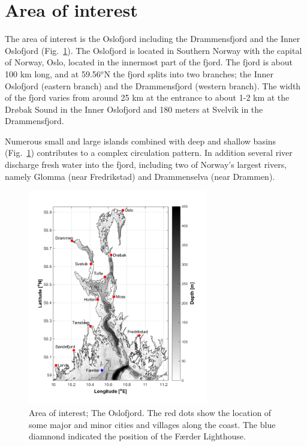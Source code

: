 \section{Area of interest}

The area of interest is the Oslofjord including the Drammensfjord and the Inner Oslofjord (Fig.~\ref{fig:kart}). The Oslofjord is located in Southern Norway with the capital of Norway, Oslo, located in the innermost part of the fjord. 
The fjord is about 100 km long, and at 59.56$^o$N the fjord splits into two branches; the Inner Oslofjord (eastern branch) and the Drammensfjord (western branch). The width of the fjord varies from around 25 km at the entrance to about 1-2 km at the Dr{\o}bak Sound in the Inner Oslofjord and 180 meters at Svelvik in the Drammensfjord.

Numerous small and large islands combined with deep and shallow basins (Fig.~\ref{fig:kart}) contributes to a complex circulation pattern. In addition several river discharge fresh water into the fjord, including two of Norway's largest rivers, namely Glomma (near Fredrikstad) and Drammenselva (near Drammen).

\begin{figure}[htb]
\centerline{
\includegraphics*[trim=0cm 0.8cm 0cm 0cm,clip=true,width=0.7\textwidth]{Figurer/kart}
}
\caption{\small
Area of interest; The Oslofjord. The red dots show the location of some major and minor cities and villages along the coast. The blue diamnond indicated the position of the F{\ae}rder Lighthouse.
}
\label{fig:kart}
\end{figure}

\newpage
